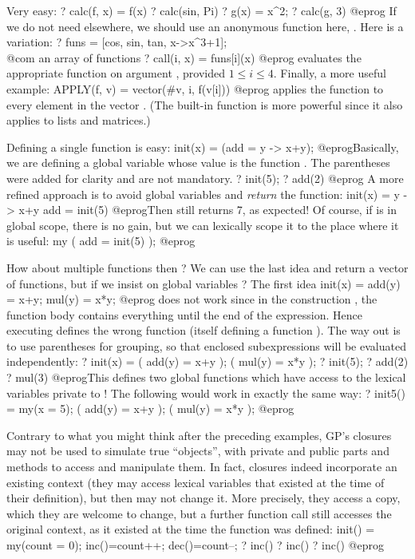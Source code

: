  Very easy:
\bprog
? calc(f, x) = f(x)
? calc(sin, Pi)
? g(x) = x^2;
? calc(g, 3)
@eprog
\noindent If we do not need  elsewhere, we should use an anonymous
function here, . Here is a variation:
\bprog
? funs = [cos, sin, tan, x->x^3+1]; \\@com an array of functions
? call(i, x) = funs[i](x)
@eprog\noindent
evaluates the appropriate function on argument ,
provided $1\leq i\leq 4$. Finally, a more useful example:
\bprog
APPLY(f, v) = vector(#v, i, f(v[i]))
@eprog\noindent
applies the function  to every element in the vector .
(The built-in function  is more powerful since it also applies to
lists and matrices.)

Defining a single function is easy:
\bprog
init(x) = (add = y -> x+y);
@eprog\noindent Basically, we are defining a global variable 
whose value is the function . The parentheses were added for
clarity and are not mandatory.
\bprog
? init(5);
? add(2)
@eprog\noindent
A more refined approach is to
avoid global variables and \emph{return} the function:
\bprog
init(x) = y -> x+y
add = init(5)
@eprog\noindent Then  still returns 7, as expected! Of course,
if  is in global scope, there is no gain, but we can
lexically scope it to the place where it is useful:
\bprog
  my ( add = init(5) );
@eprog

How about multiple functions then ? We can use the last idea and return a
vector of functions, but if we insist on global variables ?
The first idea
\bprog
init(x) = add(y) = x+y; mul(y) = x*y;
@eprog
\noindent does not work since in the construction , the
function body contains everything until the end of the expression. Hence
executing  defines the wrong function  (itself defining
a function ). The way out is to
use parentheses for grouping, so that enclosed subexpressions will be
evaluated independently:
\bprog
? init(x) = ( add(y) = x+y ); ( mul(y) = x*y );
? init(5);
? add(2)
? mul(3)
@eprog\noindent This defines two global functions which have access to the
lexical variables private to ! The following would work in exactly
the same way:
\bprog
? init5() = my(x = 5); ( add(y) = x+y ); ( mul(y) = x*y );
@eprog

 Contrary to what you might think after the
preceding examples, GP's closures may not be used to simulate true
``objects'', with private and public parts and methods to access and
manipulate them. In fact, closures indeed incorporate an existing context
(they may access lexical variables that existed at the time of their
definition), but then may not change it. More precisely, they access a copy,
which they are welcome to change, but a further function call still accesses
the original context, as it existed at the time the function was defined:
\bprog
init() =
{ my(count = 0);
  inc()=count++;
  dec()=count--;
}
? inc()
? inc()
? inc()
@eprog

